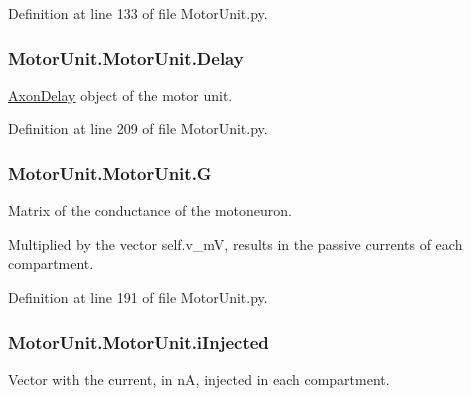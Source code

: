 Definition at line 133 of file Motor\-Unit.\-py.

\hypertarget{class_motor_unit_1_1_motor_unit_abe82ffa1e293d10225b67870a962eab8}{
\subsubsection[{Delay}]{\setlength{\rightskip}{0pt plus 5cm}Motor\-Unit.\-Motor\-Unit.\-Delay}}\label{class_motor_unit_1_1_motor_unit_abe82ffa1e293d10225b67870a962eab8}


\hyperlink{namespace_axon_delay}{Axon\-Delay} object of the motor unit. 



Definition at line 209 of file Motor\-Unit.\-py.

\hypertarget{class_motor_unit_1_1_motor_unit_a9b9f157ab92b47470ca7ec6bd3473dd3}{
\subsubsection[{G}]{\setlength{\rightskip}{0pt plus 5cm}Motor\-Unit.\-Motor\-Unit.\-G}}\label{class_motor_unit_1_1_motor_unit_a9b9f157ab92b47470ca7ec6bd3473dd3}


Matrix of the conductance of the motoneuron. 

Multiplied by the vector self.\-v\-\_\-m\-V, results in the passive currents of each compartment. 

Definition at line 191 of file Motor\-Unit.\-py.

\hypertarget{class_motor_unit_1_1_motor_unit_a06045eca379d38892670a491dbac0829}{
\subsubsection[{i\-Injected}]{\setlength{\rightskip}{0pt plus 5cm}Motor\-Unit.\-Motor\-Unit.\-i\-Injected}}\label{class_motor_unit_1_1_motor_unit_a06045eca379d38892670a491dbac0829}


Vector with the current, in n\-A, injected in each compartment. 



